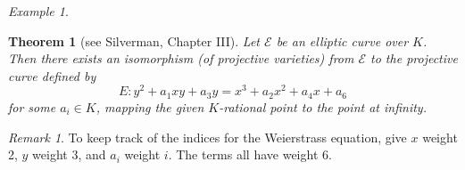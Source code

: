 \documentclass[a4paper]{article}
\theoremstyle{plain}
\newtheorem{theorem}{Theorem}
\theoremstyle{remark}
\newtheorem*{remark}{Remark}
\newtheorem*{example}{Example}
\theoremstyle{definition}
\newcommand{\E}{\mathcal{E}}
\begin{document}
\begin{example}
\begin{figure}[htb]
        \medskip
        \begin{subfigure}{0.25\textwidth}
        \end{subfigure}
        \begin{subfigure}{0.25\textwidth}
        \end{subfigure}
    \end{figure}
\end{example}

\begin{theorem}[see Silverman, Chapter III]
    Let $\E$ be an elliptic curve over $K$. Then there exists an isomorphism (of
    projective varieties) from $\E$ to the projective curve defined by
    \begin{equation*}
        E : y^2 + a_1xy + a_3y = x^3 + a_2x^2 + a_4x + a_6
    \end{equation*}
    for some $a_i\in K$, mapping the given $K$-rational point to the point at
    infinity.
\end{theorem}

\begin{remark}
    To keep track of the indices for the Weierstrass equation, give $x$ weight
    2, $y$ weight 3, and $a_i$ weight $i$. The terms all have weight 6.
\end{remark}
\end{document}
